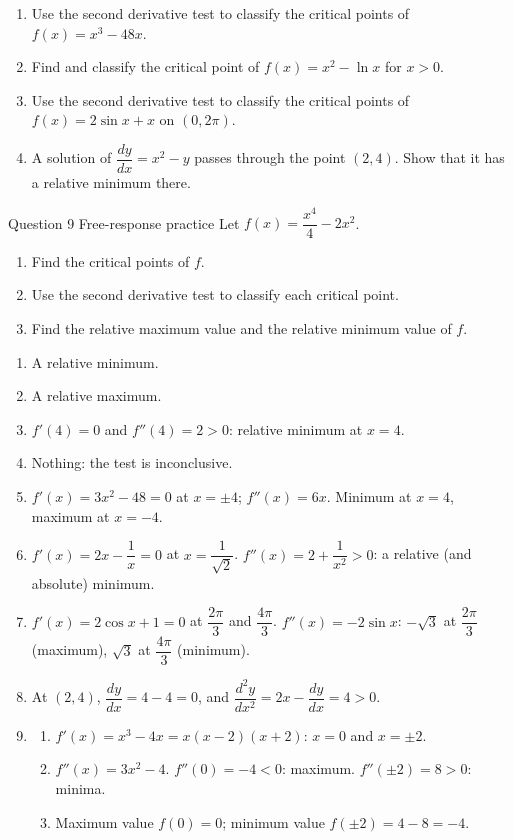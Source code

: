 \documentclass[11pt]{article}
\begin{document}
\begin{enumerate}[leftmargin=*,itemsep=2pt,start=5]
  \item Use the second derivative test to classify the critical points of $f(x)=x^3-48x$.\work{2.8cm}
  \item Find and classify the critical point of $f(x)=x^2-\ln x$ for $x>0$.\work{2.8cm}
  \item Use the second derivative test to classify the critical points of $f(x)=2\sin x+x$ on $(0,2\pi)$.\work{2.8cm}
  \item A solution of $\dfrac{dy}{dx}=x^2-y$ passes through the point $(2,4)$. Show that it has a relative minimum there.\work{2.8cm}
\end{enumerate}

\begin{frbox}{Question 9 \textperiodcentered{} Free-response practice}
Let $f(x)=\dfrac{x^4}{4}-2x^2$.
\begin{enumerate}[label=(\alph*),leftmargin=*,itemsep=2pt]
  \item Find the critical points of $f$.\work{2.6cm}
  \item Use the second derivative test to classify each critical point.\work{2.6cm}
  \item Find the relative maximum value and the relative minimum value of $f$.\work{2.6cm}
\end{enumerate}
\end{frbox}

\newpage
\begin{solbox}
\begin{enumerate}[leftmargin=*,itemsep=4pt]
  \item A relative minimum.
  \item A relative maximum.
  \item $f'(4)=0$ and $f''(4)=2>0$: relative minimum at $x=4$.
  \item Nothing: the test is inconclusive.
  \item $f'(x)=3x^2-48=0$ at $x=\pm4$; $f''(x)=6x$. Minimum at $x=4$, maximum at $x=-4$.
  \item $f'(x)=2x-\dfrac1x=0$ at $x=\dfrac{1}{\sqrt2}$. $f''(x)=2+\dfrac{1}{x^2}>0$: a relative (and absolute) minimum.
  \item $f'(x)=2\cos x+1=0$ at $\dfrac{2\pi}{3}$ and $\dfrac{4\pi}{3}$. $f''(x)=-2\sin x$: $-\sqrt3$ at $\dfrac{2\pi}{3}$ (maximum), $\sqrt3$ at $\dfrac{4\pi}{3}$ (minimum).
  \item At $(2,4)$, $\dfrac{dy}{dx}=4-4=0$, and $\dfrac{d^2y}{dx^2}=2x-\dfrac{dy}{dx}=4>0$.
  \item \begin{enumerate}[label=(\alph*),leftmargin=*,itemsep=3pt]
    \item $f'(x)=x^3-4x=x(x-2)(x+2)$: $x=0$ and $x=\pm2$.
    \item $f''(x)=3x^2-4$. $f''(0)=-4<0$: maximum. $f''(\pm2)=8>0$: minima.
    \item Maximum value $f(0)=0$; minimum value $f(\pm2)=4-8=-4$.
  \end{enumerate}
\end{enumerate}
\end{solbox}
\end{document}
